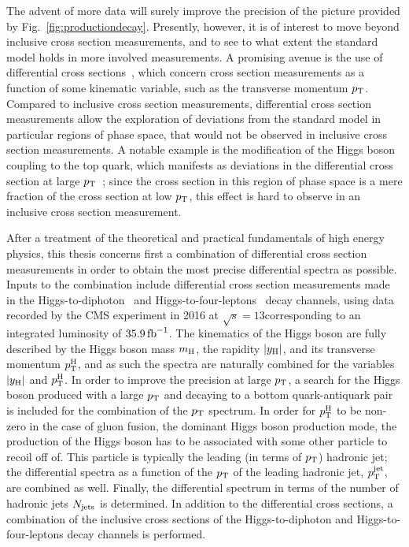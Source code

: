 The advent of more data will surely improve the precision of the picture provided by Fig.~\ref{fig:productiondecay}.
% 
Presently, however, it is of interest to move beyond inclusive cross section measurements, and to see to what extent the standard model holds in more involved measurements.
% 
A promising avenue is the use of differential cross sections~\cite{Aad:2014lwa,Khachatryan:2015rxa,Aad:2014tca,Khachatryan:2015yvw,Aad:2016lvc,Khachatryan:2016vnn,Aaboud:2018xdt,Sirunyan:2018kta,Aaboud:2017oem,Sirunyan:2017exp,Aaboud:2018ezd}, which concern cross section measurements as a function of some kinematic variable, such as the transverse momentum $p_\mathrm{T}$.
% 
Compared to inclusive cross section measurements, differential cross section measurements allow the exploration of deviations from the standard model in particular regions of phase space, that would not be observed in inclusive cross section measurements.
% 
A notable example is the modification of the Higgs boson coupling to the top quark, which manifests as deviations in the differential cross section at large $p_\mathrm{T}$~\cite{Grazzini:2017szg,Grazzini:2016paz}; since the cross section in this region of phase space is a mere fraction of the cross section at low $p_\mathrm{T}$, this effect is hard to observe in an inclusive cross section measurement.


After a treatment of the theoretical and practical fundamentals of high energy physics, this thesis concerns first a combination of differential cross section measurements in order to obtain the most precise differential spectra as possible.
% 
Inputs to the combination include differential cross section measurements made in the Higgs-to-diphoton~\cite{Sirunyan:2018kta} and Higgs-to-four-leptons~\cite{Sirunyan:2017exp} decay channels, using data recorded by the CMS experiment in 2016 at $\sqrt{s}=13$\TeV corresponding to an integrated luminosity of $35.9\,\text{fb}^{-1}$.
% 
The kinematics of the Higgs boson are fully described by the Higgs boson mass $m_{\mathrm{H}}$, the rapidity $\left|y_\mathrm{H}\right| $, and its transverse momentum $p_\mathrm{T}^\mathrm{H}$, and as such the spectra are naturally combined for the variables $\left|y_\mathrm{H}\right| $ and $p_\mathrm{T}^\mathrm{H}$.
% 
In order to improve the precision at large $p_\mathrm{T}$, a search for the Higgs boson produced with a large $p_\mathrm{T}$ and decaying to a bottom quark-antiquark pair~\cite{Sirunyan:2017dgc} is included for the combination of the $p_\mathrm{T}$ spectrum.
% 
% 
In order for $p_\mathrm{T}^\mathrm{H}$ to be non-zero in the case of gluon fusion, the dominant Higgs boson production mode, the production of the Higgs boson has to be associated with some other particle to recoil off of.
% 
This particle is typically the leading (in terms of $p_\mathrm{T}$) hadronic jet; the differential spectra as a function of the $p_\mathrm{T}$ of the leading hadronic jet, $p_\mathrm{T}^\text{jet} $, are combined as well.
% 
Finally, the differential spectrum in terms of the number of hadronic jets $N_\text{jets} $ is determined.
% 
In addition to the differential cross sections, a combination of the inclusive cross sections of the  Higgs-to-diphoton and Higgs-to-four-leptons decay channels is performed.


